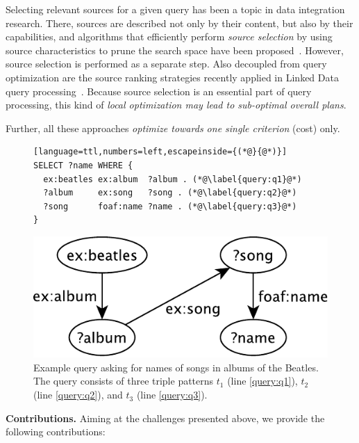 Selecting relevant sources for a given query has been a topic in
data integration research. There, sources are described
not only by their content, but also by their capabilities, and
algorithms that efficiently perform \emph{source selection} by using
source characteristics to prune the search space have been
proposed~\cite{levy_querying_1996}. However, source selection is
performed as a separate step. Also decoupled from query optimization
are the source ranking strategies recently applied in Linked Data
query processing~\cite{harth_data_2010,ladwig_linked_2010}. Because
source selection is an essential part of query processing, this kind
of \emph{local optimization may lead to sub-optimal overall plans}.


Further, all these approaches \emph{optimize towards one single
  criterion} (cost) only.

\begin{figure}[ht]
  \vspace{-0.3cm}
  \centering
  \begin{minipage}{0.75\linewidth}
\begin{lstlisting}[language=ttl,numbers=left,escapeinside={(*@}{@*)}]
SELECT ?name WHERE {
  ex:beatles ex:album  ?album . (*@\label{query:q1}@*)
  ?album     ex:song   ?song . (*@\label{query:q2}@*)
  ?song      foaf:name ?name . (*@\label{query:q3}@*)
}
\end{lstlisting}
  \vspace{-0.3cm}
  \end{minipage}
  \vspace{-0.3cm}
  \includegraphics[width=0.7\linewidth]{figs/query-crop.pdf}
  \caption{Example query asking for names of songs in albums of the
    Beatles. The query consists of three triple patterns $t_1$ (line
    \ref{query:q1}), $t_2$ (line \ref{query:q2}), and $t_3$ (line
    \ref{query:q3}).}
  \label{fig:query}
\end{figure}

\textbf{Contributions.} Aiming at the challenges presented above, we
provide the following contributions:

